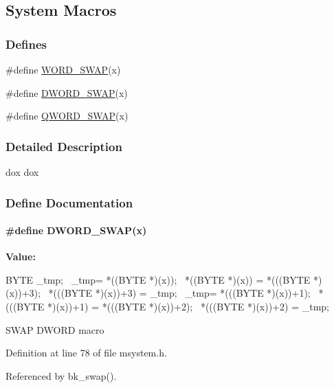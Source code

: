 \subsection{System Macros}
\label{group__msmacroh}
\subsubsection*{Defines}
\begin{DoxyCompactItemize}
\item 
\#define \hyperlink{group__msmacroh_ga4670ac841b4b8e3c3141a91a743bc61d}{WORD\_\-SWAP}(x)
\item 
\#define \hyperlink{group__msmacroh_gadb40ea04e4e009bbde68c027a8f95039}{DWORD\_\-SWAP}(x)
\item 
\#define \hyperlink{group__msmacroh_ga8c6db33e3f8af89e87556d9f7a9b32a8}{QWORD\_\-SWAP}(x)
\end{DoxyCompactItemize}


\subsubsection{Detailed Description}
dox dox 

\subsubsection{Define Documentation}
\paragraph[{DWORD\_\-SWAP}]{\setlength{\rightskip}{0pt plus 5cm}\#define DWORD\_\-SWAP(x)}\hfill\label{group__msmacroh_gadb40ea04e4e009bbde68c027a8f95039}
{\bfseries Value:}
\begin{DoxyCode}
{ BYTE _tmp;                              \
                       _tmp= *((BYTE *)(x));                    \
                       *((BYTE *)(x)) = *(((BYTE *)(x))+3);     \
                       *(((BYTE *)(x))+3) = _tmp;               \
                       _tmp= *(((BYTE *)(x))+1);                \
                       *(((BYTE *)(x))+1) = *(((BYTE *)(x))+2); \
                       *(((BYTE *)(x))+2) = _tmp; }
\end{DoxyCode}
SWAP DWORD macro 

Definition at line 78 of file msystem.h.

Referenced by bk\_\-swap().
